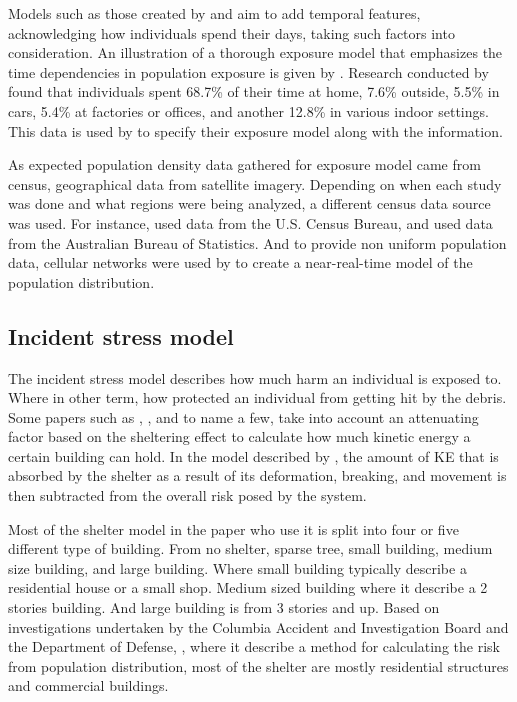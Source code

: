 \documentclass[12pt]{report}
\begin{document}
            Models such as those created by \cite{burke_system-level_2011} and \cite{melnyk_third-party_2014} aim to add temporal features, acknowledging how individuals
            spend their days, taking such factors into consideration. An illustration of a thorough exposure model that
            emphasizes the time dependencies in population exposure is given by \cite{melnyk_third-party_2014}. Research conducted by \cite{klepeis_national_2001} found
            that individuals spent 68.7\% of their time at home, 7.6\% outside, 5.5\% in cars, 5.4\% at factories or
            offices, and another 12.8\% in various indoor settings. This data is used by \cite{melnyk_third-party_2014} to specify their exposure
            model along with the information.

            As expected population density data gathered for exposure model came from census, geographical data from
            satellite imagery. Depending on when each study was done and what regions were being analyzed, a different
            census data source was used. For instance, \cite{burke_system-level_2011} used data from the U.S. Census Bureau, and \cite{clothier_casualty_2007} used data
            from the Australian Bureau of Statistics. And to provide non uniform population data, cellular networks were
            used by \cite{ancel_real-time_2017} to create a near-real-time model of the population distribution.

        \subsection{Incident stress model}
            The incident stress model describes how much harm an individual is exposed to. Where in other term, how
            protected an individual from getting hit by the debris. Some papers such as \cite{primatesta_ground_2020},
            \cite{cour-harbo_ground_2020}, and \cite{dalamagkidis_evaluating_2008} to name a few, take into account an
            attenuating factor based on the sheltering effect to calculate how much kinetic energy a certain building
            can hold. In the model described by \cite{ball_crash_2012}, the amount of KE that is absorbed by the shelter
            as a result of its deformation, breaking, and movement is then subtracted from the overall risk posed by the
            system.

            Most of the shelter model in the paper who use it is split into four or five different type of building.
            From no shelter, sparse tree, small building, medium size building, and large building. Where small building
            typically describe a residential house or a small shop. Medium sized building where it describe a 2 stories
            building. And large building is from 3 stories and up. Based on investigations undertaken by the Columbia
            Accident and Investigation Board and the Department of Defense, \cite{melnyk_third-party_2014}, where it
            describe a method for calculating the risk from population distribution, most of the shelter are mostly
            residential structures and commercial buildings.
\end{document}
